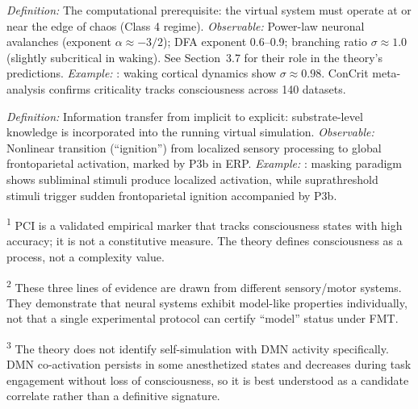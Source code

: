 \documentclass[12pt]{article}
\begin{document}
\begin{description}[leftmargin=0pt,labelindent=0pt,itemsep=0.8em]
\item[\textsc{Criticality}] \emph{Definition:} The computational prerequisite: the virtual system must operate at or near the edge of chaos (Class 4 regime). \emph{Observable:} Power-law neuronal avalanches (exponent $\alpha \approx -3/2$); DFA exponent 0.6--0.9; branching ratio $\sigma \approx 1.0$ (slightly subcritical in waking). See Section~3.7 for their role in the theory's predictions. \emph{Example:} \citet{Priesemann2014}: waking cortical dynamics show $\sigma \approx 0.98$. ConCrit meta-analysis \citep{AlgomShriki2026} confirms criticality tracks consciousness across 140 datasets.

\item[\textsc{``Becomes conscious''}] \emph{Definition:} Information transfer from implicit to explicit: substrate-level knowledge is incorporated into the running virtual simulation. \emph{Observable:} Nonlinear transition (``ignition'') from localized sensory processing to global frontoparietal activation, marked by P3b in ERP. \emph{Example:} \citet{Dehaene2006}: masking paradigm shows subliminal stimuli produce localized activation, while suprathreshold stimuli trigger sudden frontoparietal ignition accompanied by P3b.

\end{description}


\textsuperscript{1} PCI is a validated empirical marker that tracks consciousness states with high accuracy; it is not a constitutive measure. The theory defines consciousness as a process, not a complexity value.

\textsuperscript{2} These three lines of evidence are drawn from different sensory/motor systems. They demonstrate that neural systems exhibit model-like properties individually, not that a single experimental protocol can certify ``model'' status under FMT.

\textsuperscript{3} The theory does not identify self-simulation with DMN activity specifically. DMN co-activation persists in some anesthetized states and decreases during task engagement without loss of consciousness, so it is best understood as a candidate correlate rather than a definitive signature.
\end{document}
